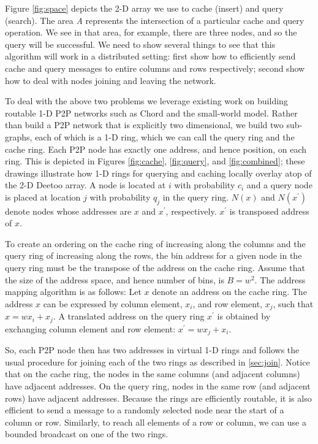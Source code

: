 \documentclass[conference]{IEEEtran}
\begin{document}
Figure \ref{fig:space} depicts the 2-D array we use to cache (insert)
and query (search).  The area \textit{A} represents the
intersection of a particular cache and query operation.  We see in that
area, for example, there are three nodes, and so the query will be successful.  We need to
show several things to see that this algorithm will work in a distributed
setting: first show how to efficiently send cache and query messages to entire columns
and rows respectively; second show how to deal with nodes joining and leaving the network.

To deal with the above two problems we leverage existing work on building
routable 1-D P2P networks such as Chord\cite{is:Chord} and the small-world
model\cite{jk:Algorithmic}.  Rather than build a P2P network that is
explicitly two dimensional, we build two sub-graphs, each of which is a 1-D 
ring, which we can call the query ring and the cache ring.  Each P2P 
node has exactly one address, and hence position, on each ring.  This is
depicted in Figures \ref{fig:cache}, \ref{fig:query}, and \ref{fig:combined}; 
these drawings illustrate how  1-D rings for querying and caching 
locally overlay atop of the 2-D Deetoo array.
A node is located at $i$ with probability $c_{i}$ and a
query node is placed at location $j$ with probability $q_{j}$ in the query ring. 
$N(x)$ and $N(x^\prime)$ denote nodes whose addresses are $x$ and $x^\prime$, respectively.
$x^\prime$ is transposed address of $x$.

To create an ordering on the cache ring of increasing
along the columns and the query ring of increasing along the rows, the bin
address for a given node in the query ring must be the transpose of the
address on the cache ring.  
Assume that the size of the address space,
and hence number of bins, is $B=w^2$.
The address mapping algorithm is as
follows: Let $x$ denote an address on the cache ring. The address
$x$ can be expressed by
column element, $x_{i}$, and row element, $x_{j}$, such
that $x = w x_i + x_j$.
A translated address on the query ring $x^\prime$ is obtained by exchanging
column element and row element:
$x^\prime = w x_{j} +x_{i}$.

So, each P2P node then has two addresses in virtual 1-D rings and follows the usual
procedure for joining each of the two rings as described in \ref{sec:join}.
Notice that on the cache ring, the nodes in the same columns (and adjacent
columns) have adjacent addresses.  On the query ring, nodes in the same row
(and adjacent rows) have adjacent addresses.  Because the rings are efficiently
routable, it is also efficient to send a message to a randomly selected node near
the start of a column or row.  Similarly, to reach all elements of a row or
column, we can use a bounded broadcast on one of the two rings.  
\end{document}
